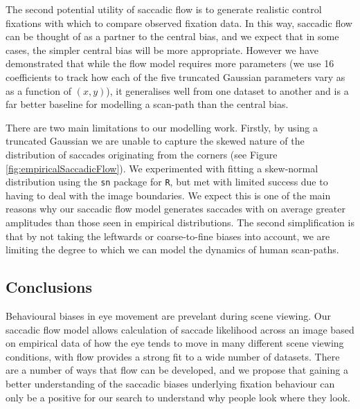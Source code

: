 \documentclass[a4paper, twocolumn, oneside, 10pt]{article}
\begin{document}
The second potential utility of saccadic flow is to generate realistic control fixations with which to compare observed fixation data. In this way, saccadic flow can be thought of as a partner to the \cite{clarke-tatler2014} central bias, and we expect that in some cases, the simpler central bias will be more appropriate. However we have demonstrated that while the flow model requires more parameters (we use 16 coefficients to track how each of the five truncated Gaussian parameters vary as as a function of $(x,y)$), it generalises well from one dataset to another and is a far better baseline for modelling a scan-path than the central bias.

There are two main limitations to our modelling work. Firstly, by using a truncated Gaussian we are unable to capture the skewed nature of the distribution of saccades originating from the corners (see Figure \ref{fig:empiricalSaccadicFlow}). We experimented with fitting a skew-normal distribution using the \texttt{sn} package for \texttt{R}, but met with limited success due to having to deal with the image boundaries. We expect this is one of the main reasons why our saccadic flow model generates saccades with on average greater amplitudes than those seen in empirical distributions. The second simplification is that by not taking the leftwards or coarse-to-fine biases into account, we are limiting the degree to which we can model the dynamics of human scan-paths.

\subsection{Conclusions}
Behavioural biases in eye movement are prevelant during scene viewing. Our saccadic flow model allows calculation of saccade likelihood across an image based on empirical data of how the eye tends to move in many different scene viewing conditions, with flow provides a strong fit to a wide number of datasets. There are a number of ways that flow can be developed, and we propose that gaining a better understanding of the saccadic biases underlying fixation behaviour can only be a positive for our search to understand why people look where they look.



\end{document}
